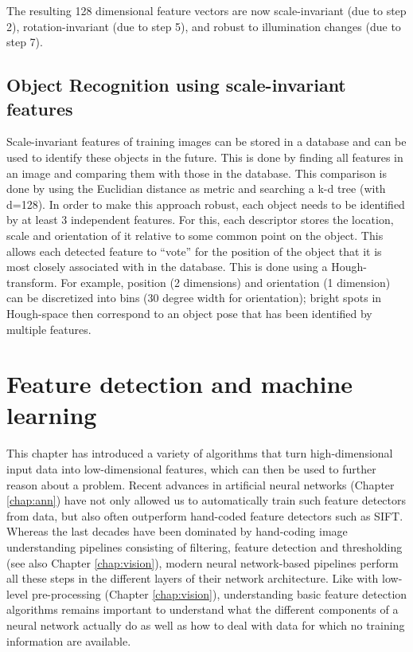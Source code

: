 The resulting 128 dimensional feature vectors are now scale-invariant (due to step 2), rotation-invariant (due to step 5), and robust to illumination changes (due to step 7).

\subsection{Object Recognition using scale-invariant features}
Scale-invariant features of training images can be stored in a database and can be used to identify these objects in the future. This is done by finding all features in an image and comparing them with those in the database. This comparison is done by using the Euclidian distance as metric and searching a k-d tree (with d=128). In order to make this approach robust, each object needs to be identified by at least 3 independent features. For this, each descriptor stores the location, scale and orientation of it relative to some common point on the object. This allows each detected feature to ``vote'' for the position of the object that it is most closely associated with in the database.  This is done using a Hough-transform. For example, position (2 dimensions) and orientation (1 dimension) can be discretized into bins (30 degree width for orientation); bright spots in Hough-space then correspond to an object pose that has been identified by multiple features.

\section{Feature detection and machine learning}
This chapter has introduced a variety of algorithms that turn high-dimensional input data into low-dimensional features, which can then be used to further reason about a problem. Recent advances in artificial neural networks (Chapter \ref{chap:ann}) have not only allowed us to automatically train such feature detectors from data, but also often outperform hand-coded feature detectors such as SIFT. Whereas the last decades have been dominated by hand-coding image understanding pipelines consisting of filtering, feature detection and thresholding (see also Chapter \ref{chap:vision}), modern neural network-based pipelines perform all these steps in the different layers of their network architecture. Like with low-level pre-processing (Chapter \ref{chap:vision}), understanding basic feature detection algorithms remains important to understand what the different components of a neural network actually do as well as how to deal with data for which no training information are available. 

